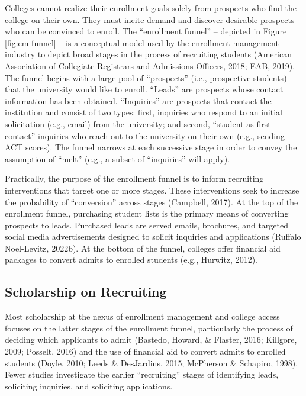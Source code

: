 \documentclass[
  12pt,
]{article}
\begin{document}
Colleges cannot realize their enrollment goals solely from prospects who find the college on their own. They must incite demand and discover desirable prospects who can be convinced to enroll. The ``enrollment funnel'' -- depicted in Figure \ref{fig:em-funnel} -- is a conceptual model used by the enrollment management industry to depict broad stages in the process of recruiting students (American Association of Collegiate Registrars and Admissions Officers, 2018; EAB, 2019). The funnel begins with a large pool of ``prospects'' (i.e., prospective students) that the university would like to enroll. ``Leads'' are prospects whose contact information has been obtained. ``Inquiries'' are prospects that contact the institution and consist of two types: first, inquiries who respond to an initial solicitation (e.g., email) from the university; and second, ``student-as-first-contact'' inquiries who reach out to the university on their own (e.g., sending ACT scores). The funnel narrows at each successive stage in order to convey the assumption of ``melt'' (e.g., a subset of ``inquiries'' will apply).

Practically, the purpose of the enrollment funnel is to inform recruiting interventions that target one or more stages. These interventions seek to increase the probability of ``conversion'' across stages (Campbell, 2017). At the top of the enrollment funnel, purchasing student lists is the primary means of converting prospects to leads. Purchased leads are served emails, brochures, and targeted social media advertisements designed to solicit inquiries and applications (Ruffalo Noel-Levitz, 2022b). At the bottom of the funnel, colleges offer financial aid packages to convert admits to enrolled students (e.g., Hurwitz, 2012).

\hypertarget{scholarship-on-recruiting}{%
\subsection{Scholarship on Recruiting}\label{scholarship-on-recruiting}}

Most scholarship at the nexus of enrollment management and college access focuses on the latter stages of the enrollment funnel, particularly the process of deciding which applicants to admit (Bastedo, Howard, \& Flaster, 2016; Killgore, 2009; Posselt, 2016) and the use of financial aid to convert admits to enrolled students (Doyle, 2010; Leeds \& DesJardins, 2015; McPherson \& Schapiro, 1998). Fewer studies investigate the earlier ``recruiting'' stages of identifying leads, soliciting inquiries, and soliciting applications.
\end{document}
